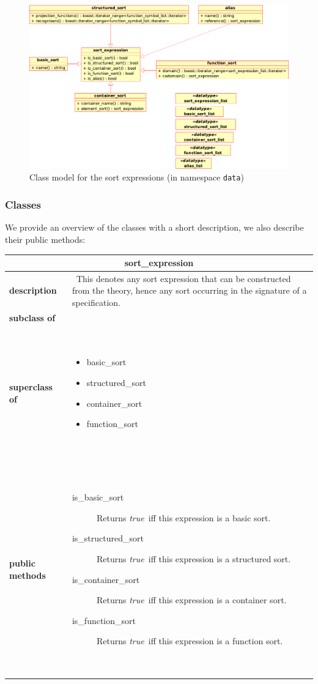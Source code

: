 \documentclass[a4paper,11pt]{article}
\newcommand{\true}{\textit{true~}}
\newcommand{\dataclass}[5]{
\begin{flushleft}
\begin{longtable}{p{3cm} p{11cm}}
\multicolumn{2}{c}{\textbf{#1}}\\\hline\hline
\textbf{description} & ~#2~ \\\hline
\textbf{subclass of} & ~#3~ \\\hline
\textbf{superclass of} & ~#4~ \\\hline
\textbf{public methods} & ~#5~ \\\hline
\end{longtable}
\end{flushleft}
}
\begin{document}
  \begin{figure}[htp]
    \begin{center}
      \includegraphics[width=\textwidth]{sort_expr}
      \caption{Class model for the sort expressions (in namespace \texttt{data})}
      \label{fig:class_sort_expr}
    \end{center}
  \end{figure}

\subsubsection{Classes}
We provide an overview of the classes with a short description, we also describe their public methods: 

\dataclass
  {sort\_expression}
  {This denotes any sort expression that can be constructed from the theory, hence any sort occurring in the signature of a specification.}
  {}
  {\begin{itemize}
    \item basic\_sort
    \item structured\_sort
    \item container\_sort
    \item function\_sort
   \end{itemize}}
  {\begin{description}
    \item[is\_basic\_sort] Returns \true iff this expression is a basic sort.
    \item[is\_structured\_sort] Returns \true iff this expression is a structured sort.
    \item[is\_container\_sort] Returns \true iff this expression is a container sort.
    \item[is\_function\_sort] Returns \true iff this expression is a function sort.
   \end{description}}
\end{document}
